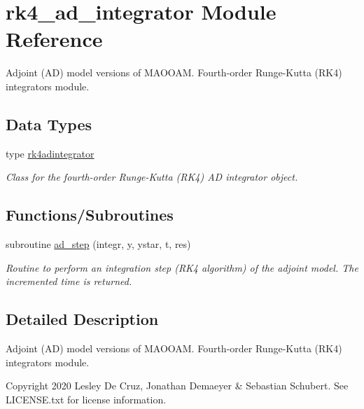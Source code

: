 \hypertarget{namespacerk4__ad__integrator}{}\section{rk4\+\_\+ad\+\_\+integrator Module Reference}
\label{namespacerk4__ad__integrator}


Adjoint (AD) model versions of M\+A\+O\+O\+AM. Fourth-\/order Runge-\/\+Kutta (R\+K4) integrators module.  


\subsection*{Data Types}
\begin{DoxyCompactItemize}
\item 
type \hyperlink{structrk4__ad__integrator_1_1rk4adintegrator}{rk4adintegrator}
\begin{DoxyCompactList}\small\item\em Class for the fourth-\/order Runge-\/\+Kutta (R\+K4) AD integrator object. \end{DoxyCompactList}\end{DoxyCompactItemize}
\subsection*{Functions/\+Subroutines}
\begin{DoxyCompactItemize}
\item 
subroutine \hyperlink{namespacerk4__ad__integrator_a875c0a5db0eb3b6d55f9655716aa3deb}{ad\+\_\+step} (integr, y, ystar, t, res)
\begin{DoxyCompactList}\small\item\em Routine to perform an integration step (R\+K4 algorithm) of the adjoint model. The incremented time is returned. \end{DoxyCompactList}\end{DoxyCompactItemize}


\subsection{Detailed Description}
Adjoint (AD) model versions of M\+A\+O\+O\+AM. Fourth-\/order Runge-\/\+Kutta (R\+K4) integrators module. 

\begin{DoxyCopyright}{Copyright}
2020 Lesley De Cruz, Jonathan Demaeyer \& Sebastian Schubert. See L\+I\+C\+E\+N\+S\+E.\+txt for license information. 
\end{DoxyCopyright}


